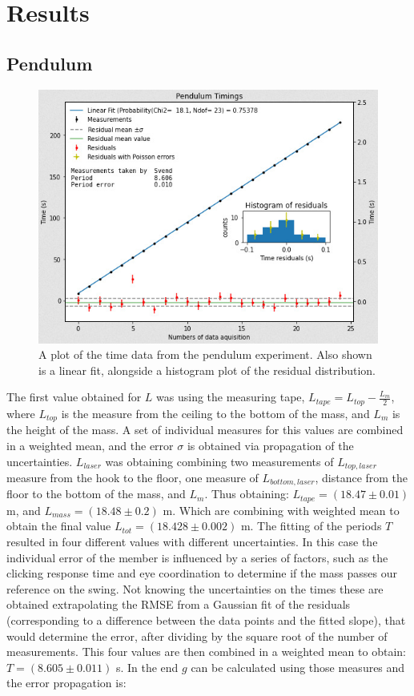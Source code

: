 \documentclass[a4paper,%
               aps,%
               prl,%
               amsfonts,%
               amssymb,%
               amsmath,%
               nobibnotes,%
               twocolumn, %
               twoside,%
               balancelastpage,%
               eqsecnum] %
               {revtex4-1}
\begin{document}
\section{Results}

\subsection{Pendulum}

\begin{figure}[h]
\centering
\includegraphics[width=\linewidth]{pendulum.jpeg}
\caption{A plot of the time data from the pendulum experiment. Also shown is a linear fit, alongside a histogram plot of the residual distribution. \label{fig:pendulumfit}}
\end{figure}

The first value obtained for $L$ was using the measuring tape, 
$L_{tape}=L_{top}-\frac{L_{m}}{2}$, where $L_{top}$ is the measure from the ceiling to the bottom of the mass, and $L_{m}$ is the height of the mass. A set of individual measures for this values are combined in a weighted mean, and the error $\sigma$ is obtained via propagation of the uncertainties. $L_{laser}$ was obtaining combining two measurements of $L_{top ,laser}$ measure from the hook to the floor, one measure of $L_{bottom ,laser}$, distance from the floor to the bottom of the mass, and $L_{m}$. Thus obtaining: $L_{tape}=(18.47 \pm 0.01)$ m, and $L_{mass}=(18.48 \pm 0.2)$ m. Which are combining with weighted mean to obtain the final value  $L_{tot}=(18.428 \pm 0.002)$ m. 
The fitting of the periods $T$ resulted in four different values with different uncertainties. In this case the individual error of the member is influenced by a series of factors, such as the clicking response time and eye coordination to determine if the mass passes our reference on the swing. Not knowing the uncertainties on the times these are obtained extrapolating the RMSE from a Gaussian fit of the residuals (corresponding to a difference between the data points and the fitted slope), that would determine the error, after dividing by the square root of the number of measurements. This four values are then combined in a weighted mean to obtain: $T=(8.605\pm 0.011)$ s. 
In the end $g$ can be calculated using those measures and the error propagation is: 
\end{document}
